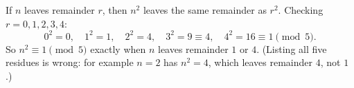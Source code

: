If $n$ leaves remainder $r$, then $n^2$ leaves the same remainder as $r^2$. Checking $r=0,1,2,3,4$:
\[0^2=0,\quad1^2=1,\quad2^2=4,\quad3^2=9\equiv4,\quad4^2=16\equiv1\pmod5 .\]
So $n^2\equiv1\pmod5$ exactly when $n$ leaves remainder $\boxed{1\text{ or }4}$. (Listing all five residues is wrong: for example $n=2$ has $n^2=4$, which leaves remainder $4$, not $1$.)
